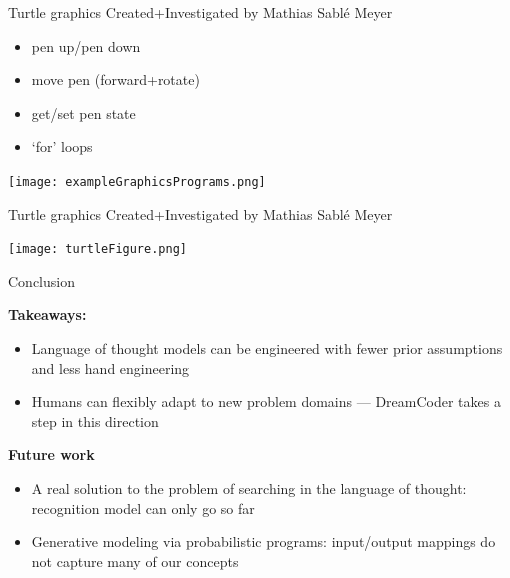 \documentclass{beamer}
\begin{document}
\begin{frame}{Turtle graphics}
  Created+Investigated by Mathias Sabl\'e Meyer
  
  \vspace{0.5cm}
  
  \begin{itemize}
  \item pen up/pen down
  \item move pen (forward+rotate)
  \item get/set pen state
  \item `for' loops
  \end{itemize}

  \centering
  \texttt{[image: exampleGraphicsPrograms.png]}

\end{frame}
\begin{frame}{Turtle graphics}
  Created+Investigated by Mathias Sabl\'e Meyer
  
  \vspace{0.5cm}
  
  \texttt{[image: turtleFigure.png]}

  \end{frame}

\begin{frame}{Conclusion}

  \textbf{Takeaways:}
  \begin{itemize}
  \item Language of thought models can be engineered with fewer prior assumptions and less hand engineering
    \item Humans can flexibly adapt to new problem domains --- DreamCoder takes a step in this direction
  \end{itemize}
  \pause

  \textbf{Future work}

  \begin{itemize}
  \item A real solution to the problem of searching in the language of thought: recognition model can only go so far
    \pause
    \item Generative modeling via probabilistic programs: input/output mappings do not capture many of our concepts
    \end{itemize}

  \end{frame}
\end{document}
